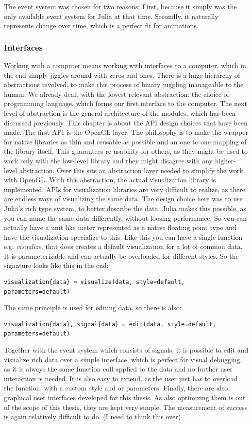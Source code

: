 The event system was chosen for two reasons:
First, because it simply was the only available event system for Julia at that time.
Secondly, it naturally represents change over time, which is a perfect fit for animations.


\subsubsection{Interfaces}
Working with a computer means working with interfaces to a computer, which in the end simply jiggles around with zeros and ones. There is a huge hierarchy of abstractions involved, to make this process of binary juggling manageable to the human.
We already dealt with the lowest relevant abstraction: the choice of programming language, which forms our first interface to the computer.
The next level of abstraction is the general architecture of the modules, which has been discussed previously. 
This chapter is about the API design choices that have been made.
The first API is the OpenGL layer. The philosophy is to make the wrapper for native libraries as thin and reusable as possible and an one to one mapping of the library itself.
This guarantees re-usability for others, as they might be used to work only with the low-level library and they might disagree with any higher-level abstraction.
Over this sits an abstraction layer needed to simplify the work with OpenGL.
With this abstraction, the actual visualization library is implemented.
APIs for visualization libraries are very difficult to realize, as there are endless ways of visualizing the same data.
The design choice here was to use Julia's rich type system, to better describe the data. 
Julia makes this possible, as you can name the same data differently, without loosing performance.
So you can actually have a unit like meter represented as a native floating point type and have the visualization specialize to this.
Like this you can have a single function e.g. \textit{visualize}, that does creates a default visualization for a lot of common data.
It is parameterizable and can actually be overloaded for different styles.
So the signature looks like this in the end:
\begin{lstlisting}
visualization{data} = visualize(data, style=default, parameters=default)
\end{lstlisting}
The same principle is used for editing data, so there is also:
\begin{lstlisting}
visualization{data}, signal{data} = edit(data, style=default, parameters=default)
\end{lstlisting}
Together with the event system which consists of signals, it is possible to edit and visualize rich data over a simple interface, which is perfect for visual debugging, as it is always the same function call applied to the data and no further user interaction is needed.
It is also easy to extend, as the user just has to overload the function, with a custom style and or parameters.
Finally, there are also graphical user interfaces developed for this thesis. As also optimizing them is out of the scope of this thesis, they are kept very simple.
The measurement of success is again relatively difficult to do. (I need to think this over)

